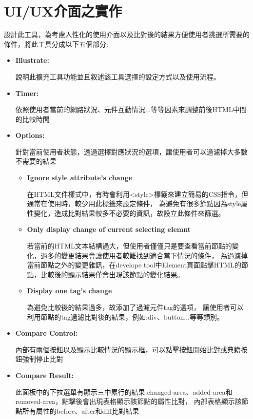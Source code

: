 \section{UI/UX介面之實作}\label{s3.4}
設計此工具，為考慮人性化的使用介面以及比對後的結果方便使用者挑選所需要的條件，將此工具分成以下五個部分:
\begin{itemize}
    \item\textbf{Illustrate:}
    
    說明此擴充工具功能並且敘述該工具選擇的設定方式以及使用流程。

    \item\textbf{Timer:}
    
    依照使用者當前的網路狀況、元件互動情況...等等因素來調整前後HTML中間的比較時間
    
    \item\textbf{Options:}
    
    針對當前使用者狀態，透過選擇對應狀況的選項，讓使用者可以過濾掉大多數不需要的結果
    \begin{itemize}
        \item\textbf{Ignore style attribute's change}
 
        在HTML文件樣式中，有時會利用<style>標籤來建立簡易的CSS指令，但通常在使用時，較少用此標籤來設定條件，
        為避免有很多節點因為style屬性變化，造成比對結果較多不必要的資訊，故設立此條件來篩選。

        \item\textbf{Only display change of current selecting elemnt}
        
        若當前的HTML文本結構過大，但使用者僅僅只是要查看當前節點的變化，過多的變更結果會讓使用者較難找到適合當下情況的條件，
        為過濾掉當前節點之外的變更雜訊，在develope tool中Element頁面點擊HTML的節點，比較後的顯示結果僅會出現該節點的變化結果。
        
        \item\textbf{Display one tag's change}
        
        為避免比較後的結果過多，故添加了過濾元件tag的選項，
        讓使用者可以利用節點的tag過濾比對後的結果，例如:div、button...等等類別。
    \end{itemize}
    
    \item\textbf{Compare Control:}
 
    內部有兩個按鈕以及顯示比較情況的顯示框，可以點擊按鈕開始比對或典籍按鈕強制停止比對
    
    \item\textbf{Compare Result:}

    此面板中的下拉選單有顯示三中累行的結果:changed-area、added-area和removed-area，點擊後會出現表格顯示該節點的屬性比對，
    內部表格顯示該節點所有屬性的before、after和diff比對結果
    
    \end{itemize}
\indent

